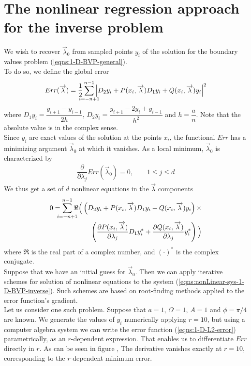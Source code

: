 \documentclass[12pt,twoside]{report}
\begin{document}
\section{The nonlinear regression approach for the inverse problem}
We wish to recover $\overrightarrow{\lambda}_0$ from sampled points $y_i$ of the solution for the boundary values problem (\ref{eqns:1-D-BVP-general}).\\
To do so, we define the global error
\begin{align}
\label{eqns:1-D-L2-error}
Err(\overrightarrow{\lambda}) = \dfrac{1}{2}\sum_{\mathclap{i=-n+1}}^{n-1} \Big \vert D_2 y_i + P(x_i, \overrightarrow{\lambda})D_1 y_i + Q(x_i, \overrightarrow{\lambda})y_i \Big \vert ^2
\end{align}
where $D_1 y_i = \dfrac{y_{i+1}-y_{i-1}}{2h}$, $D_2 y_i= \dfrac{y_{i+1}-2y_i +y_{i-1}}{h^2}$ and $h = \dfrac{a}{n}$. Note that the absolute value is in the complex sense.\\
Since $y_i$ are exact values of the solution at the points $x_i$, the functional $Err$ has a minimizing argument $\overrightarrow{\lambda}_0$ at which it vanishes. As a local minimum, $\overrightarrow{\lambda}_0$ is characterized by 
\begin{align}
\dfrac{\partial}{\partial \lambda_j} Err(\overrightarrow{\lambda}_0) = 0, \qquad 1 \leq j \leq d
\end{align}
We thus get a set of $d$ nonlinear equations in the $\overrightarrow{\lambda}$ components
\begin{align}
\label{eqns:nonLinear-sys-1-D-BVP-inverse}
0=\sum_{\mathclap{i=-n+1}}^{n-1}\Re \Big(\left(D_2 y_i + P(x_i, \overrightarrow{\lambda})D_1 y_i + Q(x_i, \overrightarrow{\lambda})y_i \right)\times\notag\\ 
\left( \dfrac{\partial P(x_i, \overrightarrow{\lambda})}{\partial \lambda_j}D_1y_i^*  + \dfrac{\partial Q(x_i, \overrightarrow{\lambda})}{\partial \lambda_j}y_i^*\right)\Big)
\end{align}
where $\Re$ is the real part of a complex number, and $(\cdot)^*$ is the complex conjugate.\\
Suppose that we have an initial guess for $\overrightarrow{\lambda}_0$. Then we can apply iterative schemes for solution of nonlinear equations to the system (\ref{eqns:nonLinear-sys-1-D-BVP-inverse}). Such schemes are based on root-finding methods applied to the error function's gradient. \\

Let us consider one such problem. Suppose that $a=1$, $\Omega=1$, $A=1$ and $\phi=\pi/4$ are known. We generate the values of $y_i$ numerically applying $r=10$, but using a computer algebra system we can write the error function (\ref{eqns:1-D-L2-error}) parametrically, as an $r$-dependent expression. That enables us to differentiate $Err$ directly in $r$. As can be seen in figure , The derivative vanishes exactly  at $r=10$, corresponding to the $r$-dependent minimum error.  
\end{document}
